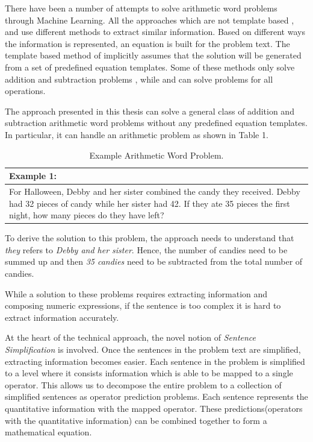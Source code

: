 \documentclass[11pt]{article}
\begin{document}
There have been a number of attempts to solve arithmetic word problems through Machine Learning. 
All the approaches which are not template based \citep{ARIS}, \citep{RoyTACL15} and \citep{RoyR15} use different methods to extract similar information. Based on different ways the information is represented, an equation is built for the problem text. The template based method of \citep{Kushman} implicitly assumes that the solution will be generated from a set of predefined equation templates. Some of these methods only solve addition and subtraction problems \citep{ARIS}, \citep{RoyTACL15} while \citep{RoyR15} and \citep{Kushman} can solve problems for all operations.

The approach presented in this thesis can solve a general class of addition and subtraction arithmetic word problems without any predefined equation templates. In particular, it can handle an arithmetic problem as shown in Table 1.

\begin{table}[h!]
\centering
\begin{tabular}{ | m{25em} | }
\hline
Example 1:\\
\hline
For Halloween, Debby and her sister combined the candy they received. Debby had 32 pieces of candy while her sister had 42. If they ate 35 pieces the first night, how many pieces do they have left?\\
\hline
\end{tabular}
\caption{Example Arithmetic Word Problem.}
\label{table:1}
\end{table}

To derive the solution to this problem, the approach needs to understand that \textit{they} refers to \textit{Debby and her sister}. Hence, the number of candies need to be summed up and then \textit{35 candies} need to be subtracted from the total number of candies. 

While a solution to these problems requires extracting information and composing numeric expressions, if the sentence is too complex it is hard to extract information accurately.

At the heart of the technical approach, the novel notion of \textit{Sentence Simplification} is involved. Once the sentences in the problem text are simplified, extracting information becomes easier. Each sentence in the problem is simplified to a level where it consists information which is able to be mapped to a single operator. This allows us to decompose the entire problem to a collection of simplified sentences as operator prediction problems. Each sentence represents the quantitative information with the mapped operator. These predictions(operators with the quantitative information) can be combined together to form a mathematical equation.
\end{document}
